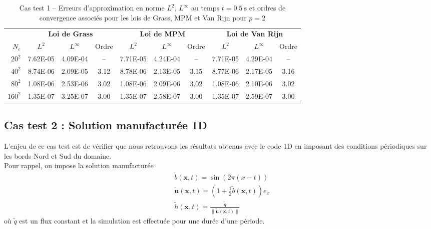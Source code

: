 \documentclass[11pt, a4paper, oneside]{report}
\begin{document}
\begin{table}[h!]
    \centering
    \small %
    \begin{tabular}{r ccc ccc ccc}
    \toprule
    & \multicolumn{3}{c}{\textbf{Loi de Grass}} & \multicolumn{3}{c}{\textbf{Loi de MPM}} & \multicolumn{3}{c}{\textbf{Loi de Van Rijn}} \\
    \cmidrule(lr){2-4} \cmidrule(lr){5-7} \cmidrule(lr){8-10}
    $N_e$ & $L^2$ & $L^\infty$ & Ordre & $L^2$ & $L^\infty$ & Ordre & $L^2$ & $L^\infty$ & Ordre \\
    \midrule
    $20^2$ & 7.62E-05 & 4.09E-04 & -- & 7.71E-05 & 4.24E-04 & -- & 7.71E-05 & 4.29E-04 & -- \\
    $40^2$ & 8.74E-06 & 2.09E-05 & 3.12 & 8.78E-06 & 2.13E-05 & 3.15 & 8.77E-06 & 2.17E-05 & 3.16 \\
    $80^2$ & 1.08E-06 & 2.53E-06 & 3.02 & 1.08E-06 & 2.09E-06 & 3.02 & 1.08E-06 & 2.10E-06 & 3.02 \\
    $160^2$ & 1.35E-07 & 3.25E-07 & 3.00 & 1.35E-07 & 2.58E-07 & 3.00 & 1.35E-07 & 2.59E-07 & 3.00 \\
    \bottomrule
    \end{tabular}
    \caption{Cas test 1 -- Erreurs d'approximation en norme $L^2$, $L^\infty$ au temps $t = \SI{0.5}{\second}$ et ordres de convergence associés pour les lois de Grass, MPM et Van Rijn pour $p = 2$}
    \label{tab:manufacturee_2D_cartesien}
\end{table}

\subsection{Cas test 2 : Solution manufacturée 1D}

L'enjeu de ce cas test est de vérifier que nous retrouvons les résultats obtenus avec le code 1D en imposant des conditions périodiques sur les bords Nord et Sud du domaine. \\
Pour rappel, on impose la solution manufacturée
\begin{equation}
    \begin{aligned}
        & \widetilde{b}(\bm{x}, t) = \sin \left( 2 \pi (x - t) \right) \\
        & \bm{\widetilde{u}}(\bm{x}, t) = \left( 1 + \frac{1}{2} \widetilde{b}(\bm{x}, t) \right) e_x \\
        & \widetilde{h}(\bm{x}, t) = \frac{\widetilde{q}}{\| \bm{\widetilde{u}}(\bm{x}, t) \|}
    \end{aligned}
\end{equation}
où $\widetilde{q}$ est un flux constant et la simulation est effectuée pour une durée d'une période.
\end{document}
